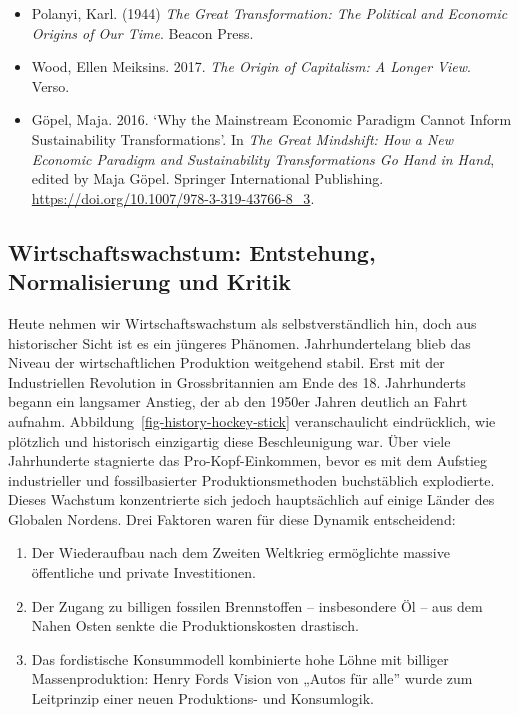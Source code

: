 \documentclass[
  nswissgerman,
  a4paper,
  DIV=11,
  numbers=noendperiod,
  oneside,
  openany]{scrreprt}
\providecommand{\tightlist}{%
  \setlength{\itemsep}{0pt}\setlength{\parskip}{0pt}}
\begin{document}
\begin{tcolorbox}[enhanced jigsaw, arc=.35mm, bottomrule=.15mm, bottomtitle=1mm, breakable, colback=white, colbacktitle=quarto-callout-caution-color!10!white, colframe=quarto-callout-caution-color-frame, coltitle=black, left=2mm, leftrule=.75mm, opacityback=0, opacitybacktitle=0.6, rightrule=.15mm, title={Weiterführende Literatur}, titlerule=0mm, toprule=.15mm, toptitle=1mm]

\begin{itemize}
\item
  Polanyi, Karl. (1944) \emph{The Great Transformation: The Political
  and Economic Origins of Our Time}. Beacon Press.
\item
  Wood, Ellen Meiksins. 2017. \emph{The Origin of Capitalism: A Longer
  View}. Verso.
\item
  Göpel, Maja. 2016. `Why the Mainstream Economic Paradigm Cannot Inform
  Sustainability Transformations'. In \emph{The Great Mindshift: How a
  New Economic Paradigm and Sustainability Transformations Go Hand in
  Hand}, edited by Maja Göpel. Springer International Publishing.
  \url{https://doi.org/10.1007/978-3-319-43766-8_3}.
\end{itemize}

\end{tcolorbox}

\subsection{Wirtschaftswachstum: Entstehung, Normalisierung und
Kritik}\label{wirtschaftswachstum-entstehung-normalisierung-und-kritik}

Heute nehmen wir Wirtschaftswachstum als selbstverständlich hin, doch
aus historischer Sicht ist es ein jüngeres Phänomen. Jahrhundertelang
blieb das Niveau der wirtschaftlichen Produktion weitgehend stabil. Erst
mit der Industriellen Revolution in Grossbritannien am Ende des 18.
Jahrhunderts begann ein langsamer Anstieg, der ab den 1950er Jahren
deutlich an Fahrt aufnahm. Abbildung~\ref{fig-history-hockey-stick}
veranschaulicht eindrücklich, wie plötzlich und historisch einzigartig
diese Beschleunigung war. Über viele Jahrhunderte stagnierte das
Pro-Kopf-Einkommen, bevor es mit dem Aufstieg industrieller und
fossilbasierter Produktionsmethoden buchstäblich explodierte. Dieses
Wachstum konzentrierte sich jedoch hauptsächlich auf einige Länder des
Globalen Nordens. Drei Faktoren waren für diese Dynamik entscheidend:

\begin{enumerate}
\def\labelenumi{\arabic{enumi}.}
\tightlist
\item
  Der Wiederaufbau nach dem Zweiten Weltkrieg ermöglichte massive
  öffentliche und private Investitionen.
\item
  Der Zugang zu billigen fossilen Brennstoffen -- insbesondere Öl -- aus
  dem Nahen Osten senkte die Produktionskosten drastisch.
\item
  Das fordistische Konsummodell kombinierte hohe Löhne mit billiger
  Massenproduktion: Henry Fords Vision von „Autos für alle'' wurde zum
  Leitprinzip einer neuen Produktions- und Konsumlogik.
\end{enumerate}
\end{document}

